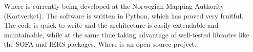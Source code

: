 Where is currently being developed at the Norwegian Mapping Authority (Kartverket). The software is written in Python, which has proved very fruitful. The code is quick to write and the architecture is easily extendable
and maintainable, while at the same time taking advantage of well-tested libraries
like the SOFA and IERS packages. Where is an open source project.

\vspace*{-10cm}

\endinput
